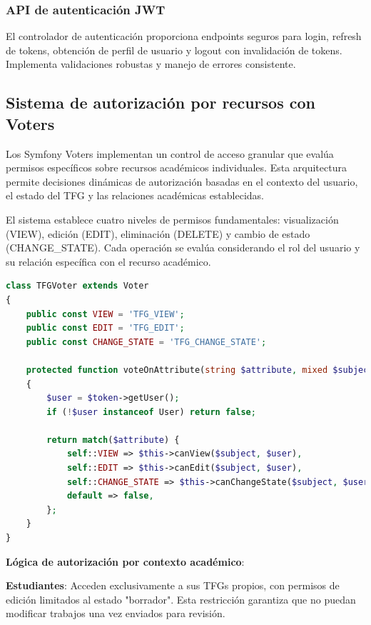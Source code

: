 \documentclass[12pt,a4paper,oneside]{report}
\begin{document}
\subsubsection{API de autenticación JWT}\label{controlador-de-autenticaciuxf3n-jwt.}

El controlador de autenticación proporciona endpoints seguros para login, refresh de tokens, obtención de perfil de usuario y logout con invalidación de tokens. Implementa validaciones robustas y manejo de errores consistente.

\subsection{Sistema de autorización por recursos con Voters}

Los Symfony Voters implementan un control de acceso granular que evalúa permisos específicos sobre recursos académicos individuales. Esta arquitectura permite decisiones dinámicas de autorización basadas en el contexto del usuario, el estado del TFG y las relaciones académicas establecidas.

El sistema establece cuatro niveles de permisos fundamentales: visualización (VIEW), edición (EDIT), eliminación (DELETE) y cambio de estado (CHANGE\_STATE). Cada operación se evalúa considerando el rol del usuario y su relación específica con el recurso académico.

\begin{lstlisting}[language=PHP]
class TFGVoter extends Voter
{
    public const VIEW = 'TFG_VIEW';
    public const EDIT = 'TFG_EDIT';
    public const CHANGE_STATE = 'TFG_CHANGE_STATE';

    protected function voteOnAttribute(string $attribute, mixed $subject, TokenInterface $token): bool
    {
        $user = $token->getUser();
        if (!$user instanceof User) return false;

        return match($attribute) {
            self::VIEW => $this->canView($subject, $user),
            self::EDIT => $this->canEdit($subject, $user),
            self::CHANGE_STATE => $this->canChangeState($subject, $user),
            default => false,
        };
    }
}
\end{lstlisting}

\textbf{Lógica de autorización por contexto académico}:

\textbf{Estudiantes}: Acceden exclusivamente a sus TFGs propios, con permisos de edición limitados al estado "borrador". Esta restricción garantiza que no puedan modificar trabajos una vez enviados para revisión.
\end{document}
